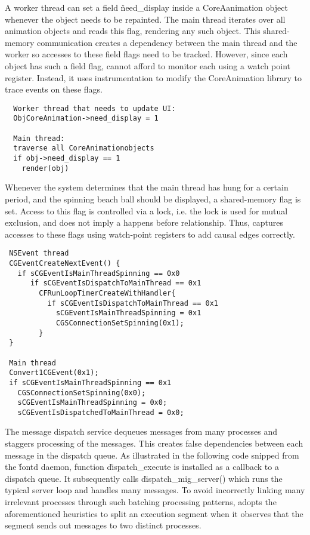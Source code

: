 A worker thread can set a field \v{need\_display} inside a CoreAanimation object
whenever the object needs to be repainted. The main thread iterates over all
animation objects and reads this flag, rendering any such object. This shared-memory communication creates
a dependency between the main thread and the worker so accesses to these
field flags need to be tracked.  However, since each object has such a
field flag, \xxx cannot afford to monitor each using a watch point
register.  Instead, it uses instrumentation to modify the CoreAnimation
library to trace events on these flags.


{\footnotesize \begin{verbatim}
  Worker thread that needs to update UI:
  ObjCoreAnimation->need_display = 1

  Main thread:
  traverse all CoreAnimationobjects
  if obj->need_display == 1
    render(obj)
\end{verbatim}
}

Whenever the system determines that the main thread has hung for a certain
period, and the spinning beach ball should be displayed, a shared-memory flag
is set. Access to this flag is controlled via a lock, i.e. the lock is used for
mutual exclusion, and does not imply a happens before relationship.  Thus,
\xxx captures accesses to these flags using watch-point registers to add
causal edges correctly.

{\footnotesize \begin{verbatim}
 NSEvent thread                     
 CGEventCreateNextEvent() {
   if sCGEventIsMainThreadSpinning == 0x0
      if sCGEventIsDispatchToMainThread == 0x1
        CFRunLoopTimerCreateWithHandler{
          if sCGEventIsDispatchToMainThread == 0x1
            sCGEventIsMainThreadSpinning = 0x1
            CGSConnectionSetSpinning(0x1);
        }
 }

 Main thread
 Convert1CGEvent(0x1);
 if sCGEventIsMainThreadSpinning == 0x1
   CGSConnectionSetSpinning(0x0);
   sCGEventIsMainThreadSpinning = 0x0;
   sCGEventIsDispatchedToMainThread = 0x0;

\end{verbatim}
}

 The message dispatch service dequeues
messages from many processes and staggers processing of the messages. This
creates false dependencies between each message in the dispatch queue.  As
illustrated in the following code snipped from the \v{fontd} daemon,
function \v{dispatch\_execute} is installed as a callback to a dispatch
queue.  It subsequently calls \v{dispatch\_mig\_server()} which runs the
typical server loop and handles many messages.  To avoid incorrectly
linking many irrelevant processes through such batching processing
patterns, \xxx adopts the aforementioned heuristics to split an execution
segment when it observes that the segment sends out messages to two
distinct processes.


